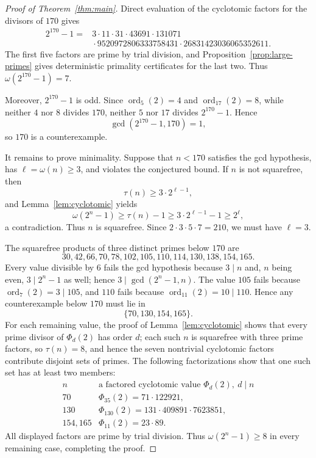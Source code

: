 \documentclass[11pt]{amsart}
\theoremstyle{remark}
\DeclareMathOperator{\ord}{ord}
\begin{document}
\begin{proof}[Proof of Theorem~\ref{thm:main}]
Direct evaluation of the cyclotomic factors for the divisors of $170$
gives
\begin{equation}\label{eq:factorization}
\begin{split}
2^{170}-1={}&3\cdot11\cdot31\cdot43691\cdot131071\\
&{}\cdot9520972806333758431
\cdot26831423036065352611.
\end{split}
\end{equation}
The first five factors are prime by trial division, and
Proposition~\ref{prop:large-primes} gives deterministic primality
certificates for the last two. Thus $\omega(2^{170}-1)=7$.

Moreover, $2^{170}-1$ is odd. Since $\ord_5(2)=4$ and
$\ord_{17}(2)=8$, while neither $4$ nor $8$ divides $170$, neither $5$
nor $17$ divides $2^{170}-1$. Hence
\[
\gcd(2^{170}-1,170)=1,
\]
so $170$ is a counterexample.

It remains to prove minimality. Suppose that $n<170$ satisfies the gcd
hypothesis, has $\ell=\omega(n)\ge3$, and violates the conjectured bound.
If $n$ is not squarefree, then
\[
\tau(n)\ge3\cdot2^{\ell-1},
\]
and Lemma~\ref{lem:cyclotomic} yields
\[
\omega(2^n-1)\ge\tau(n)-1
\ge3\cdot2^{\ell-1}-1\ge2^\ell,
\]
a contradiction. Thus $n$ is squarefree. Since
$2\cdot3\cdot5\cdot7=210$, we must have $\ell=3$.

The squarefree products of three distinct primes below $170$ are
\[
30,42,66,70,78,102,105,110,114,130,138,154,165.
\]
Every value divisible by $6$ fails the gcd hypothesis because
$3\mid n$ and, $n$ being even, $3\mid 2^n-1$ as well; hence
$3\mid\gcd(2^n-1,n)$. The value $105$ fails because
$\ord_7(2)=3\mid105$, and $110$ fails because
$\ord_{11}(2)=10\mid110$. Hence any counterexample below $170$ must lie
in
\[
\{70,130,154,165\}.
\]
For each remaining value, the proof of Lemma~\ref{lem:cyclotomic}
shows that every prime divisor of $\Phi_d(2)$ has order $d$; each such
$n$ is squarefree with three prime factors, so $\tau(n)=8$, and hence
the seven nontrivial cyclotomic factors contribute disjoint sets of
primes. The following factorizations show that one such set has at
least two members:
\[
\begin{array}{c|c}
 n & \text{a factored cyclotomic value }\Phi_d(2),\ d\mid n\\
\hline
70  & \Phi_{35}(2)=71\cdot122921,\\
130 & \Phi_{130}(2)=131\cdot409891\cdot7623851,\\
154,165 & \Phi_{11}(2)=23\cdot89.
\end{array}
\]
All displayed factors are prime by trial division. Thus
$\omega(2^n-1)\ge8$ in every remaining case, completing the proof.
\end{proof}
\end{document}
